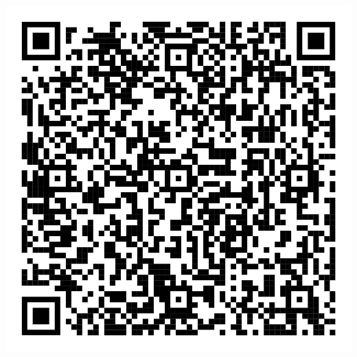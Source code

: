 \documentclass[aspectratio=169,11pt,hyperref={colorlinks=true}]{beamer}
\begin{document}
\begin{blackframe}
\begin{textblock*}{0.20\paperwidth}
    \includegraphics[width=0.20\paperwidth]{img/cdevents_0_4_slides_qrcode.png}
  \end{textblock*}
\end{blackframe}
\end{document}
